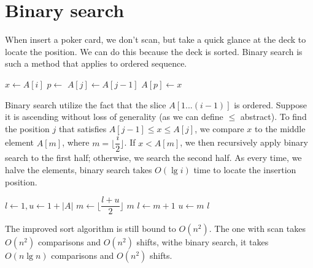 \documentclass[b5paper]{article}
\begin{document}
\begin{Exercise}
\end{Exercise}

\section{Binary search}

When insert a poker card, we don't scan, but take a quick glance at the deck to locate the position. We can do this because the deck is sorted. Binary search is such a method that applies to ordered sequence.

\begin{algorithmic}[1]
    \State $x \gets A[i]$
    \State $p \gets $ 
      \State $A[j] \gets A[j-1]$
    \EndFor
    \State $A[p] \gets x$
  \EndFor
\EndFunction
\end{algorithmic}

Binary search utilize the fact that the slice $A[1...(i-1)]$ is ordered. Suppose it is ascending without loss of generality (as we can define $\leq$ abstract). To find the position $j$ that satisfies $A[j-1] \leq x \leq A[j]$, we compare $x$ to the middle element $A[m]$, where $m = \lfloor \dfrac{i}{2} \rfloor$. If $x < A[m]$, we then recursively apply binary search to the first half; otherwise, we search the second half. As every time, we halve the elements, binary search takes $O(\lg i)$ time to locate the insertion position.

\begin{algorithmic}[1]
  \State $l \gets 1, u \gets 1+|A|$
    \State $m \gets \lfloor \dfrac{l+u}{2} \rfloor$
      \State \Return $m$ 
      \State $l \gets m+1$
    \Else
      \State $u \gets m$
    \EndIf
  \EndWhile
  \State \Return $l$
\EndFunction
\end{algorithmic}

The improved sort algorithm is still bound to $O(n^2)$. The one with scan takes $O(n^2)$ comparisons and $O(n^2)$ shifts, withe binary search, it takes $O(n \lg n)$ comparisons and $O(n^2)$ shifts.

\begin{Exercise}
\end{Exercise}
\end{document}
